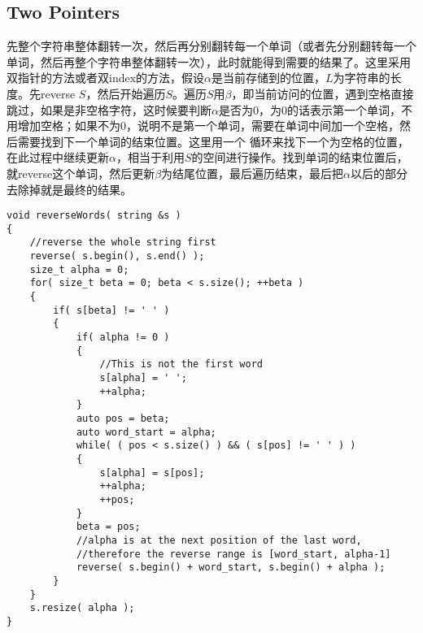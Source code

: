 \subsection{Two Pointers}
先整个字符串整体翻转一次，然后再分别翻转每一个单词（或者先分别翻转每一个单词，然后再整个字符串整体翻转一次），此时就能得到需要的结果了。这里采用双指针的方法或者双index的方法，假设$\alpha$是当前存储到的位置，$L$为字符串的长度。先reverse $S$，然后开始遍历$S$。遍历$S$用$\beta$，即当前访问的位置，遇到空格直接跳过，如果是非空格字符，这时候要判断$\alpha$是否为0，为0的话表示第一个单词，不用增加空格；如果不为0，说明不是第一个单词，需要在单词中间加一个空格，然后需要找到下一个单词的结束位置。这里用一个  循环来找下一个为空格的位置，在此过程中继续更新$\alpha$，相当于利用$S$的空间进行操作。找到单词的结束位置后，就reverse这个单词，然后更新$\beta$为结尾位置，最后遍历结束，最后把$\alpha$以后的部分去除掉就是最终的结果。
\setcounter{lstlisting}{0}
\begin{lstlisting}[style=customc, caption={Two Pointers}]
void reverseWords( string &s )
{
    //reverse the whole string first
    reverse( s.begin(), s.end() );
    size_t alpha = 0;
    for( size_t beta = 0; beta < s.size(); ++beta )
    {
        if( s[beta] != ' ' )
        {
            if( alpha != 0 )
            {
                //This is not the first word
                s[alpha] = ' ';
                ++alpha;
            }
            auto pos = beta;
            auto word_start = alpha;
            while( ( pos < s.size() ) && ( s[pos] != ' ' ) )
            {
                s[alpha] = s[pos];
                ++alpha;
                ++pos;
            }
            beta = pos;
            //alpha is at the next position of the last word,
            //therefore the reverse range is [word_start, alpha-1]
            reverse( s.begin() + word_start, s.begin() + alpha );
        }
    }
    s.resize( alpha );
}
\end{lstlisting}